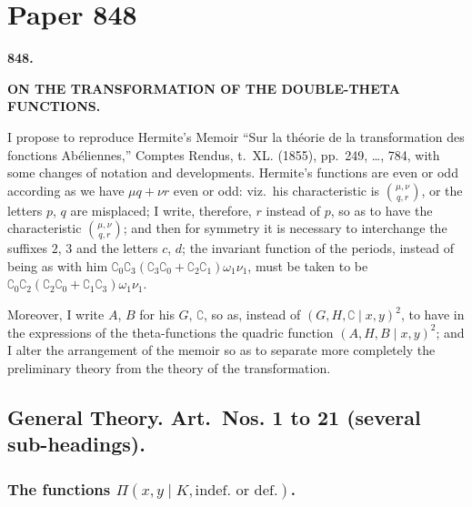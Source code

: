\documentclass[11pt,a4paper]{book}
\begin{document}
\section{Paper 848}

\begin{center}
\large\textbf{848.}

\Large\textbf{ON THE TRANSFORMATION OF THE DOUBLE-THETA FUNCTIONS.}

\end{center}

\bigskip

I propose to reproduce Hermite's Memoir ``Sur la th\'{e}orie de la transformation des fonctions Ab\'{e}liennes,'' Comptes Rendus, t.~XL. (1855), pp.~249, \ldots, 784, with some changes of notation and developments. Hermite's functions are even or odd according as we have $\mu q + \nu r$ even or odd: viz.\ his characteristic is $\binom{\mu, \nu}{q, r}$, or the letters $p$, $q$ are misplaced; I write, therefore, $r$ instead of $p$, so as to have the characteristic $\binom{\mu, \nu}{q, r}$; and then for symmetry it is necessary to interchange the suffixes $2$, $3$ and the letters $c$, $d$; the invariant function of the periods, instead of being as with him $\complement_0\complement_3(\complement_3\complement_0 + \complement_2\complement_1)\omega_1\nu_1$, must be taken to be $\complement_0\complement_2(\complement_2\complement_0 + \complement_1\complement_3)\omega_1\nu_1$.

Moreover, I write $A$, $B$ for his $G$, $\complement$, so as, instead of $(G, H, \complement \mid x, y)^2$, to have in the expressions of the theta-functions the quadric function $(A, H, B \mid x, y)^2$; and I alter the arrangement of the memoir so as to separate more completely the preliminary theory from the theory of the transformation.

\subsection*{General Theory. Art.~Nos. 1 to 21 (several sub-headings).}

\subsubsection*{The functions $\Pi(x, y \mid K, \text{indef.\ or def.})$.}
\end{document}
